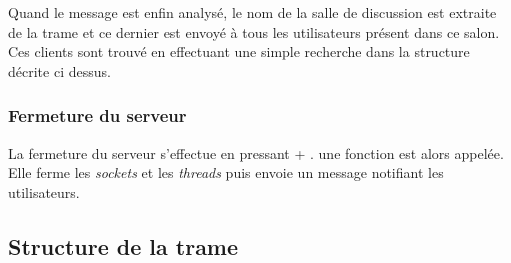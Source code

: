 \documentclass[a4paper, 12pt]{article}
\newcommand{\Touche}[1]{\Ovalbox{#1}}
\begin{document}
Quand le message est enfin analysé, le nom de la salle de discussion est extraite de la trame et ce dernier est envoyé à tous les utilisateurs présent dans ce salon. Ces clients sont trouvé en effectuant une simple recherche dans la structure décrite ci dessus.

\subsubsection{Fermeture du serveur}
La fermeture du serveur s'effectue en pressant \Touche{Ctrl} + \Touche{C}. une fonction est alors appelée. Elle ferme les \emph{sockets} et les \emph{threads} puis envoie un message notifiant les utilisateurs.

\subsection{Structure de la trame}
\end{document}
